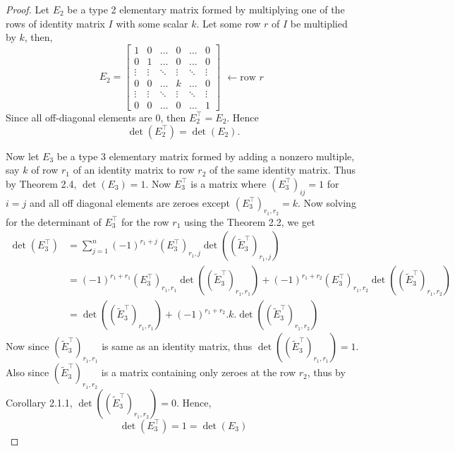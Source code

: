\documentclass[12pt, a4paper]{article}
\theoremstyle{definition}
\theoremstyle{remark}
\begin{document}
\begin{proof}
        Let $E_2$ be a type 2 elementary matrix formed by multiplying one of the rows of identity matrix $I$ with some scalar $k$. Let some row $r$ of $I$ be multiplied by $k$, then,
        \[
        E_2 = \begin{bmatrix}
        1 & 0 & \dots & 0 & \dots & 0 \\
        0 & 1 & \dots & 0 & \dots & 0 \\
        \vdots & \vdots & \ddots & \vdots & \ddots & \vdots \\
        0 & 0 & \dots & k & \dots & 0 \\
        \vdots & \vdots & \ddots & \vdots & \ddots & \vdots \\
        0 & 0 & \dots & 0 & \dots & 1
        \end{bmatrix}
        \begin{array}{l}
        \\
        \\
        \\
        \leftarrow \text{row } r \\
        \\
        \\
        \end{array}
        \]
        Since all off-diagonal elements are $0$, then $E_2^\top = E_2$. Hence
        \[
        \det(E_2^\top) = \det(E_2).
        \]

        Now let $E_3$ be a type 3 elementary matrix formed by adding a nonzero multiple, say $k$ of row $r_1$ of an identity matrix to row $r_2$ of the same identity matrix. Thus by Theorem 2.4, $\det(E_3)=1$. Now $E_3^\top$ is a matrix where $(E_3^\top)_{ij} = 1$ for $i=j$ and all off diagonal elements are zeroes except $(E_3^\top)_{r_1,r_2} = k$. Now solving for the determinant of $E_3^\top$ for the row $r_1$ using the Theorem 2.2, we get
        \begin{align*}
            \det(E_3^\top) &= \sum_{j=1}^n (-1)^{r_1+j}(E_3^\top)_{r_1,j}\det((\widetilde{E}_3^\top)_{r_1,j}) \\
                &= (-1)^{r_1+r_1}(E_3^\top)_{r_1,r_1}\det((\widetilde{E}_3^\top)_{r_1,r_1}) + (-1)^{r_1+r_2}(E_3^\top)_{r_1,r_2}\det((\widetilde{E}_3^\top)_{r_1,r_2}) \\
                    &= \det((\widetilde{E}_3^\top)_{r_1,r_1}) + (-1)^{r_1+r_2}.k.\det((\widetilde{E}_3^\top)_{r_1,r_2})
                    \end{align*}
                    Now since $(\widetilde{E}_3^\top)_{r_1,r_1}$ is same as an identity matrix, thus $\det((\widetilde{E}_3^\top)_{r_1,r_1})=1$. Also since $(\widetilde{E}_3^\top)_{r_1,r_2}$ is a matrix containing only zeroes at the row $r_2$, thus by Corollary 2.1.1, $\det((\widetilde{E}_3^\top)_{r_1,r_2})=0$. Hence,
                    \[
                    \det(E_3^\top) = 1 = \det(E_3)
                    \]
                    \end{proof}
\end{document}
